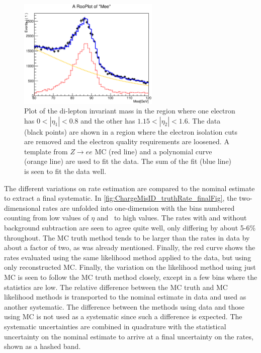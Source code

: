 \begin{figure}[htp]
\centering
\includegraphics[width=0.6\textwidth]{figures/ChargeMisID/Tot_Polynomial_0_2.eps}
\caption{Plot of the di-lepton invariant mass 
in the region where one electron has $0 < |\eta_1| < 0.8$
and the other has $1.15 < |\eta_2|<1.6$. The data (black points)
are shown in a region where the electron isolation cuts are removed
and the electron quality requirements are loosened.
A template from $Z\rightarrow ee$ MC (red line) and a polynomial
curve (orange line) are used to fit the data. The sum of the fit
(blue line) is seen to fit the data well.}
\label{fig:chargemisid_fitexample}
\end{figure} 


The different variations on  rate estimation are compared to the 
nominal estimate to extract
a final systematic. In \fig\ref{fig:ChargeMisID_truthRate_finalFig},
the two-dimensional rates are unfolded into one-dimension
with the bins numbered counting from low values of $\eta$ and \pt~to
high values. The rates with and without background
subtraction are seen to agree quite well, only 
differing by about 5-6\% throughout.  
The MC truth method tends
to be larger than the rates in data by about a factor of two,
as was already mentioned. Finally, 
the red curve shows the rates evaluated using the same likelihood method
applied to the data, but using only reconstructed MC. 
Finally, the variation on the likelihood method using just MC
is seen to follow the MC truth method closely, except in a few bins where the statistics
are low. The relative difference between the MC truth and MC likelihood methods
is transported to the nominal estimate in data and used as another systematic.
The difference between the methods using data and those using MC is not
used as a systematic since such a difference is expected.
The systematic uncertainties are combined in quadrature with the statistical
uncertainty on the nominal estimate to arrive at a final uncertainty on the
rates, shown as a hashed band.


